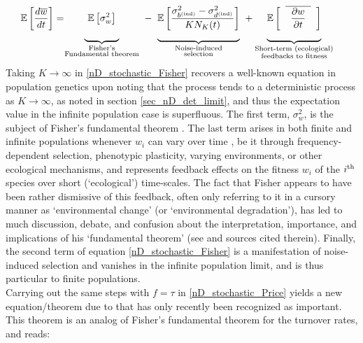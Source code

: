 \begin{align}
\label{nD_stochastic_Fisher}
\mathbb{E}\left[\frac{d\overline{w}}{dt}\right] &= 
\negmedspace {\underbrace{\mystrut{4ex} \ \vphantom{ \frac{\sigma^2_{b^{\textrm{(ind)}}} - \sigma^2_{d^{\textrm{(ind)}}}}{KN_K(t)} } \mathbb{E}\left[\sigma^2_{w}\right] \ }_{\substack{\text{Fisher's} \\ \text{Fundamental theorem}}}} \ - \ {\underbrace{\mystrut{4ex}\mathbb{E}\left[\frac{\sigma^2_{b^{\textrm{(ind)}}} - \sigma^2_{d^{\textrm{(ind)}}}}{KN_K(t)}\right]}_{\substack{\text{Noise-induced} \\ \text{selection}}}} \ + {\underbrace{\mystrut{4ex} \vphantom{ \frac{\sigma^2_{b^{\textrm{(ind)}}} - \sigma^2_{d^{\textrm{(ind)}}}}{KN_K(t)} } \mathbb{E}\left[\hphantom{a}\overline{\hphantom{a}\frac{\partial w}{\partial t}\hphantom{a}}\hphantom{a}\right]}_{\substack{\text{Short-term (ecological)} \\ \text{feedbacks to fitness}}}}
\end{align}
Taking $K \to \infty$ in \eqref{nD_stochastic_Fisher} recovers a well-known equation in population genetics upon noting that the process tends to a deterministic process as $K \to \infty$, as noted in section \ref{sec_nD_det_limit}, and thus the expectation value in the infinite population case is superfluous. The first term, $\sigma^2_w$, is the subject of Fisher's fundamental theorem \citep{price_fishers_1972, frank_fishers_1992, kokko_stagnation_2021}. The last term arises in both finite and infinite populations whenever $w_i$ can vary over time \citep{baez_fundamental_2021}, be it through frequency-dependent selection, phenotypic plasticity, varying environments, or other ecological mechanisms, and represents feedback effects on the fitness $w_i$ of the $i\textsuperscript{th}$ species over short (`ecological') time-scales. The fact that Fisher appears to have been rather dismissive of this feedback, often only referring to it in a cursory manner as `environmental change' (or `environmental degradation'), has led to much discussion, debate, and confusion about the interpretation, importance, and implications of his `fundamental theorem' (see \cite{kokko_stagnation_2021} and sources cited therein). Finally, the second term of equation \eqref{nD_stochastic_Fisher} is a manifestation of noise-induced selection and vanishes in the infinite population limit, and is thus particular to finite populations.\\
Carrying out the same steps with $f = \tau$ in \eqref{nD_stochastic_Price} yields a new equation/theorem due to \cite{kuosmanen_turnover_2022} that has only recently been recognized as important. This theorem is an analog of Fisher's fundamental theorem for the turnover rates, and reads:
